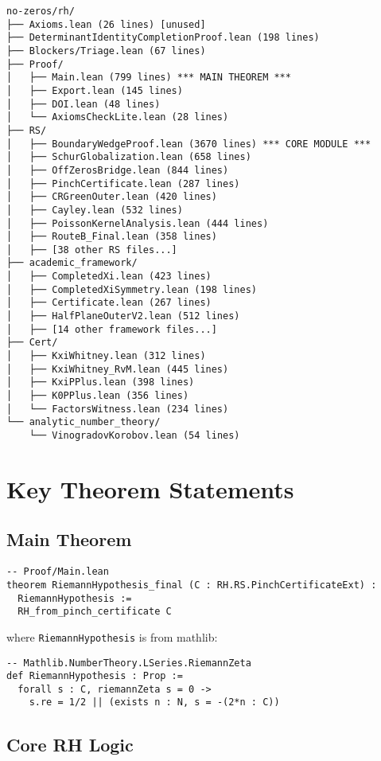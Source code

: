 \begin{small}
\begin{verbatim}
no-zeros/rh/
├── Axioms.lean (26 lines) [unused]
├── DeterminantIdentityCompletionProof.lean (198 lines)
├── Blockers/Triage.lean (67 lines)
├── Proof/
│   ├── Main.lean (799 lines) *** MAIN THEOREM ***
│   ├── Export.lean (145 lines)
│   ├── DOI.lean (48 lines)
│   └── AxiomsCheckLite.lean (28 lines)
├── RS/
│   ├── BoundaryWedgeProof.lean (3670 lines) *** CORE MODULE ***
│   ├── SchurGlobalization.lean (658 lines)
│   ├── OffZerosBridge.lean (844 lines)
│   ├── PinchCertificate.lean (287 lines)
│   ├── CRGreenOuter.lean (420 lines)
│   ├── Cayley.lean (532 lines)
│   ├── PoissonKernelAnalysis.lean (444 lines)
│   ├── RouteB_Final.lean (358 lines)
│   ├── [38 other RS files...]
├── academic_framework/
│   ├── CompletedXi.lean (423 lines)
│   ├── CompletedXiSymmetry.lean (198 lines)
│   ├── Certificate.lean (267 lines)
│   ├── HalfPlaneOuterV2.lean (512 lines)
│   ├── [14 other framework files...]
├── Cert/
│   ├── KxiWhitney.lean (312 lines)
│   ├── KxiWhitney_RvM.lean (445 lines)
│   ├── KxiPPlus.lean (398 lines)
│   ├── K0PPlus.lean (356 lines)
│   └── FactorsWitness.lean (234 lines)
└── analytic_number_theory/
    └── VinogradovKorobov.lean (54 lines)
\end{verbatim}
\end{small}

\section{Key Theorem Statements}

\subsection{Main Theorem}

\begin{lstlisting}[language=Lean]
-- Proof/Main.lean
theorem RiemannHypothesis_final (C : RH.RS.PinchCertificateExt) :
  RiemannHypothesis :=
  RH_from_pinch_certificate C
\end{lstlisting}

where \texttt{RiemannHypothesis} is from mathlib:
\begin{lstlisting}[language=Lean]
-- Mathlib.NumberTheory.LSeries.RiemannZeta
def RiemannHypothesis : Prop :=
  forall s : C, riemannZeta s = 0 ->
    s.re = 1/2 || (exists n : N, s = -(2*n : C))
\end{lstlisting}

\subsection{Core RH Logic}

